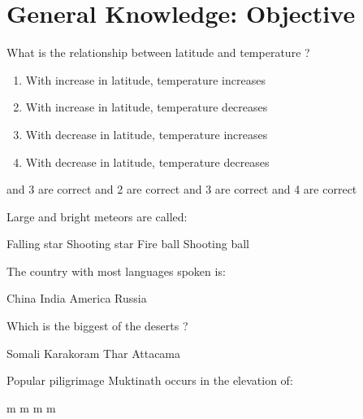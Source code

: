 \section*{General Knowledge: Objective}

\begin{questions}


\question What is the relationship between latitude and temperature ?
  \begin{enumerate}
  \item With increase in latitude, temperature increases
  \item With increase in latitude, temperature decreases
  \item With decrease in latitude, temperature increases
  \item With decrease in latitude, temperature decreases
  \end{enumerate}

  \begin{choices}
   and 3 are correct
   and 2 are correct
   and 3 are correct
   and 4 are correct
  \end{choices}

\question Large and bright meteors are called:
  \begin{choices}
  \choice Falling star
  \choice Shooting star
  \CorrectChoice Fire ball
  \choice Shooting ball
  \end{choices}

\question The country with most languages spoken is:

  \begin{oneparchoices}
  \choice China
  \CorrectChoice India
  \choice America
  \choice Russia
  \end{oneparchoices}

\question Which is the biggest of the deserts ?

  \begin{oneparchoices}
  \choice Somali
  \CorrectChoice Karakoram
  \choice Thar
  \choice Attacama
  \end{oneparchoices}

\question Popular piligrimage Muktinath occurs in the elevation of:
  \begin{choices}
   m
   m
   m
   m
  \end{choices}


\end{questions}
